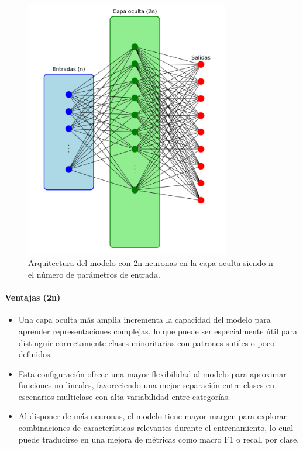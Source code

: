 \begin{figure}[H]
    \centering
    \includegraphics[width=0.8\textwidth]{./img/modelo/arqnnMUL.pdf}
    \caption{Arquitectura del modelo con 2n neuronas en la capa oculta siendo n el número de parámetros de entrada.}
    \label{fig:arqnnMUL}
\end{figure}

\paragraph{Ventajas (2n)}
\begin{itemize}
	\item Una capa oculta más amplia incrementa la capacidad del modelo para aprender representaciones complejas, lo que puede ser especialmente útil para distinguir correctamente clases minoritarias con patrones sutiles o poco definidos.
	\item Esta configuración ofrece una mayor flexibilidad al modelo para aproximar funciones no lineales, favoreciendo una mejor separación entre clases en escenarios multiclase con alta variabilidad entre categorías.
	\item Al disponer de más neuronas, el modelo tiene mayor margen para explorar combinaciones de características relevantes durante el entrenamiento, lo cual puede traducirse en una mejora de métricas como macro F1 o recall por clase.
\end{itemize}

